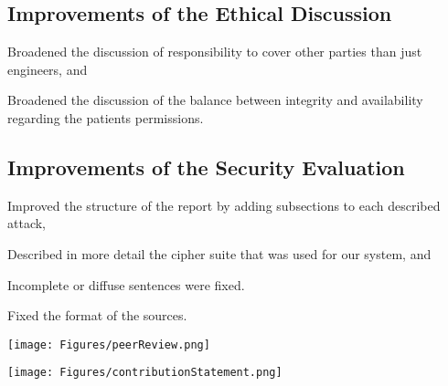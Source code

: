 \documentclass{article}
\begin{document}
\subsection*{Improvements of the Ethical Discussion}
\begin{description}[font=$\bullet$\scshape\bfseries]
    \item Broadened the discussion of responsibility to cover other parties than just engineers, and
    \item Broadened the discussion of the balance between integrity and availability regarding the patients permissions.
\end{description}

\subsection*{Improvements of the Security Evaluation}
\begin{description}[font=$\bullet$\scshape\bfseries]
    \item Improved the structure of the report by adding subsections to each described attack,
    \item Described in more detail the cipher suite that was used for our system, and
    \item Incomplete or diffuse sentences were fixed.
    \item Fixed the format of the sources.
\end{description}

\newpage

\texttt{[image: Figures/peerReview.png]}

\newpage

\texttt{[image: Figures/contributionStatement.png]}


\bibliographystyl
\printbibliography
\end{document}
